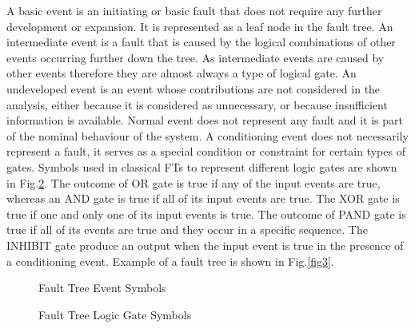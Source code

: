 \documentclass[10pt]{llncs}
\begin{document}
A basic event is an initiating or basic fault that does not require any further development or expansion. It is represented as a leaf node in the fault tree. An intermediate event is a fault that is caused by the logical combinations of other events occurring further down the tree. As intermediate events are caused by other events therefore they are almost always a type of logical gate. An undeveloped event is an event whose contributions are not considered in the analysis, either because it is considered as unnecessary, or because insufficient information is available. Normal event does not represent any fault and it is part of the nominal behaviour of the system.  A conditioning event does not necessarily represent a fault, it serves as a special condition or constraint for certain types of gates. Symbols used in classical FTs to represent different logic gates are shown in Fig.\ref{fig2}.  The outcome of OR gate is true if any of the input events are true, whereas an AND gate is true if all of its input events are true. The XOR gate is true if one and only one of its input events is true. The outcome of PAND gate is true if all of its events   are true and they occur in a specific sequence. The INHIBIT gate produce an output when the input event is true in the presence of a conditioning event. Example of a fault tree is shown in Fig.\ref{fig3}\cite{John1998}.


\begin{figure}[thpb]
      \centering
      \caption{Fault Tree Event Symbols}
      \label{fig1}
   \end{figure}


\begin{figure}[thpb]
      \centering
      \caption{Fault Tree Logic Gate Symbols}
      \label{fig2}
   \end{figure}
\end{document}
